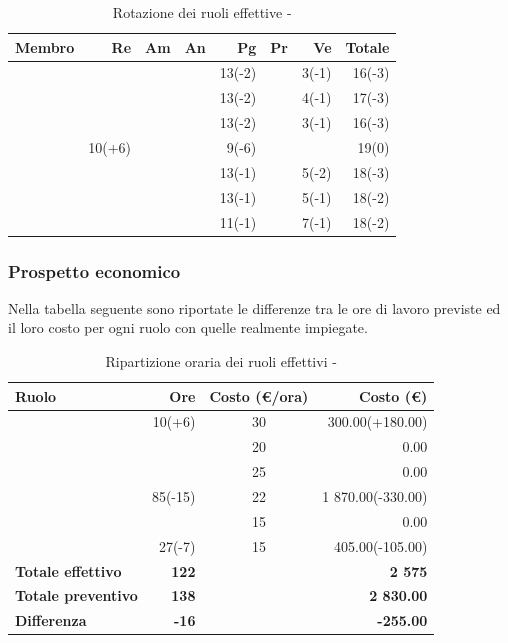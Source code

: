 \documentclass[12pt,a4paper]{article}
\begin{document}
\begin{table}[H]
	\begin{center}
		\begin{tabular}{l r r r r r r r}
			\toprule
			\textbf{Membro}	&	\textbf{Re}	&	\textbf{Am}	& \textbf{An} & \textbf{Pg} & \textbf{Pr} & \textbf{Ve} & \textbf{Totale}\\
			\midrule
			\midrule
			\IB{} & & & & 13(-2) & & 3(-1) & 16(-3) \\
			\midrule
			\AB{} & & & & 13(-2) & & 4(-1) & 17(-3) \\
			\midrule
			\NDC{} & & & & 13(-2) & & 3(-1) & 16(-3) \\
			\midrule
			\TP{} & 10(+6) & & & 9(-6) & & & 19(0) \\
			\midrule
			\WS{} & & & & 13(-1) & & 5(-2) & 18(-3) \\
			\midrule
			\AVE{} & & & & 13(-1) & & 5(-1) & 18(-2) \\
			\midrule
			\AVI{} & & & & 11(-1) & & 7(-1) & 18(-2) \\
			\bottomrule
		\end{tabular}
		\caption{Rotazione dei ruoli effettive - \FPD{}}
	\end{center}
\end{table}

\subsubsection{Prospetto economico}
Nella tabella seguente sono riportate le differenze tra le ore di lavoro previste ed il loro costo per ogni ruolo con quelle realmente impiegate.

\begin{table}[H]
	\begin{center}
		\begin{tabular}{l r c r}
			\toprule
			\textbf{Ruolo}	& \textbf{Ore} & \textbf{Costo (\euro/ora)}	& \textbf{Costo (\euro)} \\ \midrule
			\midrule	
			\RE{} & 10(+6) & 30 & 300.00(+180.00) \\ \midrule
			\AM{} & & 20 & 0.00 \\ \midrule
			\AN{} & & 25 & 0.00 \\ \midrule
			\PG{} & 85(-15) & 22 & 1 870.00(-330.00) \\ \midrule
			\PR{} & & 15 & 0.00 \\ \midrule
			\VR{} & 27(-7) & 15 & 405.00(-105.00) \\ \midrule
            \textbf{Totale effettivo} & \textbf{122} &  & \textbf{2 575} \\ \midrule
			\textbf{Totale preventivo} & \textbf{138} &  & \textbf{2 830.00} \\ \midrule
			\textbf{Differenza} & \textbf{-16} &  & \textbf{-255.00} \\ \midrule
			\bottomrule
		\end{tabular}
		\caption{Ripartizione oraria dei ruoli effettivi - \FPD{}}
	\end{center}
\end{table}
\end{document}
